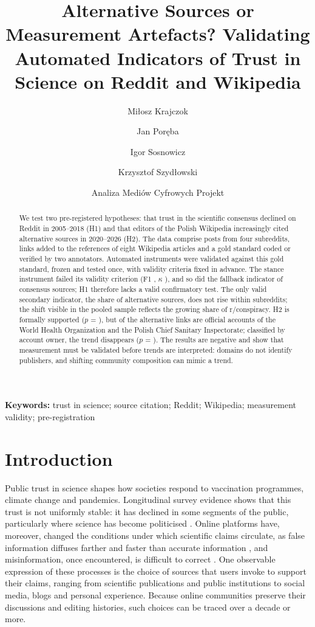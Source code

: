 \documentclass[10pt,a4paper]{article}
\title{Alternative Sources or Measurement Artefacts? Validating Automated Indicators of Trust in Science on Reddit and Wikipedia}
\author{Miłosz Krajczok \and Jan Poręba \and Igor Sosnowicz \and Krzysztof Szydłowski}
\date{Analiza Mediów Cyfrowych Projekt}
\begin{document}
\maketitle

\begin{abstract}
We test two pre-registered hypotheses: that trust in the scientific consensus declined on
Reddit in 2005--2018 (H1) and that editors of the Polish Wikipedia increasingly cited
alternative sources in 2020--2026 (H2). The data comprise \resHoneSample{} posts from four
subreddits, \resHtwoLinks{} links added to the references of eight Wikipedia articles and a
gold standard coded or verified by two annotators. Automated instruments were validated
against this gold standard, frozen and tested once, with validity criteria fixed in
advance. The stance instrument failed its validity criterion (F1 \resHoneATestChallengesF,
$\kappa$ \resHoneATestKappa), and so did the fallback indicator of consensus sources; H1
therefore lacks a valid confirmatory test. The only valid secondary indicator, the share of
alternative sources, does not rise within subreddits; the shift visible in the pooled
sample reflects the growing share of r/conspiracy. H2 is formally supported
($p$ = \resHtwoP), but \resHtwoOfficialLinks{} of the \resHtwoAlternativeLinks{} alternative
links are official accounts of the World Health Organization and the Polish Chief Sanitary
Inspectorate; classified by account owner, the trend disappears ($p$ = \resHtwoExactP). The
results are negative and show that measurement must be validated before trends are
interpreted: domains do not identify publishers, and shifting community composition can
mimic a trend.
\end{abstract}

\noindent\textbf{Keywords:} trust in science; source citation; Reddit; Wikipedia;
measurement validity; pre-registration


\section{Introduction}

Public trust in science shapes how societies respond to vaccination programmes, climate
change and pandemics. Longitudinal survey evidence shows that this trust is not uniformly
stable: it has declined in some segments of the public, particularly where science has
become politicised \cite{gauchat2012}. Online platforms have, moreover, changed the
conditions under which scientific claims circulate, as false information diffuses farther
and faster than accurate information \cite{vosoughi2018}, and misinformation, once
encountered, is difficult to correct \cite{lewandowsky2012}. One observable expression of
these processes is the choice of sources that users invoke to support their claims,
ranging from scientific publications and public institutions to social media, blogs and
personal experience. Because online communities preserve their discussions and editing
histories, such choices can be traced over a decade or more.
\end{document}
